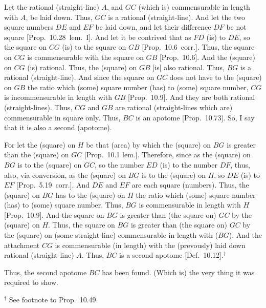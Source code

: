 \begin{Parallel}{}{}
{Let the rational (straight-line) $A$, and $GC$ (which is)
commensurable in length with $A$, be laid down. Thus, $GC$ is a rational (straight-line).
And let the two square numbers $DE$ and $EF$ be laid down, and let
their
difference $DF$ be not square [Prop.~10.28~lem.~I]. 
And let it be contrived that as $FD$ (is) to $DE$, so the square on $CG$ (is) to the square on $GB$ [Prop.~10.6~corr.].
Thus, the square on $CG$ is commensurable with the square on $GB$ [Prop.~10.6]. And the (square) on $CG$ (is) rational.
Thus, the (square) on $GB$ [is] also rational. Thus, $BG$ is a rational
(straight-line).  And since the square on $GC$ does not have to the
(square) on $GB$ the ratio which (some) square number (has) to
(some) square number, $CG$ is incommensurable in length with $GB$
[Prop.~10.9]. And they are both rational (straight-lines). Thus, $CG$ and $GB$ are rational (straight-lines which are)
commensurable in square only. Thus, $BC$ is an apotome [Prop.~10.73]. So, I say that it is also a second
(apotome).

\epsfysize=0.65in
\centerline{}

For let the (square) on $H$ be that (area) by which the (square) on $BG$
is greater than the (square) on $GC$ [Prop.~10.1 lem.]. Therefore, since
as the (square) on $BG$ is to the (square) on $GC$, so the number $ED$
(is) to the number $DF$, thus, also, via conversion, as the (square) on $BG$
is to the (square) on $H$, so $DE$ (is) to $EF$ [Prop.~5.19~corr.]. And $DE$ and $EF$ are each
square (numbers). Thus, the (square) on $BG$ has to the (square)
on $H$ the ratio which (some) square number (has) to (some) square number.
Thus, $BG$ is commensurable in length with $H$ [Prop.~10.9]. 
And the square on $BG$ is greater than (the square on) $GC$ by the (square)
on $H$.
Thus, the square on $BG$ is greater
than (the square on) $GC$ by the (square) on (some straight-line)
commensurable in length with ($BG$). And the attachment $CG$
is commensurable (in length) with the (prevously) laid down rational (straight-line) $A$.
Thus, $BC$ is a second apotome [Def.~10.12].$^\dag$

Thus, the second apotome $BC$ has been found. (Which is) the very thing
it was required to show.}
\end{Parallel}
{\footnotesize\noindent$^\dag$ See footnote to Prop.~10.49.}

